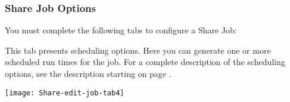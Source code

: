 %
%


\subsubsection{Share Job Options}

You must complete the following tabs to configure a Share Job:



\ifShareGuide

\fi

\ifCombinedConnectorGuide
This tab presents scheduling options. Here you can generate one or
more scheduled run times for the job. For a complete description of
the scheduling options, see the description starting on page
\pageref{scheduling}.
\fi


\texttt{[image: Share-edit-job-tab4]}

